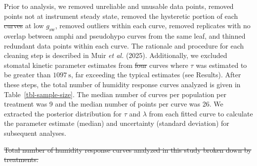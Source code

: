 \documentclass[
  letterpaper,
  DIV=11,
  numbers=noendperiod]{scrartcl}
\newcommand{\gsw}{$g_\mathrm{sw}$}
\providecommand{\DIFaddtex}[1]{{\protect\color{blue}\uwave{#1}}} %
\providecommand{\DIFdeltex}[1]{{\protect\color{red}\sout{#1}}}                      %
\providecommand{\DIFaddbegin}{} %
\providecommand{\DIFaddend}{} %
\providecommand{\DIFdelbegin}{} %
\providecommand{\DIFdelend}{} %
\providecommand{\DIFdelFL}[1]{\DIFdel{#1}} %
\providecommand{\DIFadd}[1]{\texorpdfstring{\DIFaddtex{#1}}{#1}} %
\providecommand{\DIFdel}[1]{\texorpdfstring{\DIFdeltex{#1}}{}} %
\newcommand{\DIFscaledelfig}{0.5}
\newlength{\DIFdelgraphicswidth} %
\newlength{\DIFdelgraphicsheight} %
\newcommand{\DIFaddincludegraphics}[2][]{{\color{blue}\fbox{\DIFOincludegraphics[#1]{#2}}}} %
\newcommand{\DIFdelincludegraphics}[2][]{%
\sbox{\DIFdelgraphicsbox}{\DIFOincludegraphics[#1]{#2}}%
\settoboxwidth{\DIFdelgraphicswidth}{\DIFdelgraphicsbox} %
\settoboxtotalheight{\DIFdelgraphicsheight}{\DIFdelgraphicsbox} %
\scalebox{\DIFscaledelfig}{%
\parbox[b]{\DIFdelgraphicswidth}{\usebox{\DIFdelgraphicsbox}\\[-\baselineskip] \rule{\DIFdelgraphicswidth}{0em}}\llap{\resizebox{\DIFdelgraphicswidth}{\DIFdelgraphicsheight}{%
\setlength{\unitlength}{\DIFdelgraphicswidth}%
\begin{picture}(1,1)%
\thicklines\linethickness{2pt} %
{\color[rgb]{1,0,0}\put(0,0){\framebox(1,1){}}}%
{\color[rgb]{1,0,0}\put(0,0){\line( 1,1){1}}}%
{\color[rgb]{1,0,0}\put(0,1){\line(1,-1){1}}}%
\end{picture}%
}\hspace*{3pt}}} %
} %
\DeclareRobustCommand{\DIFaddbegin}{\DIFOaddbegin \let\includegraphics\DIFaddincludegraphics} %
\DeclareRobustCommand{\DIFaddend}{\DIFOaddend \let\includegraphics\DIFOincludegraphics} %
\DeclareRobustCommand{\DIFdelbegin}{\DIFOdelbegin \let\includegraphics\DIFdelincludegraphics} %
\DeclareRobustCommand{\DIFdelend}{\DIFOaddend \let\includegraphics\DIFOincludegraphics} %
\begin{document}
Prior to analysis, we removed unreliable and unusable data points,
removed points not at instrument steady state, removed the hysteretic
portion of each \DIFdelbegin \DIFdel{curves }\DIFdelend \DIFaddbegin \DIFadd{curve }\DIFaddend at low \gsw{}, removed outliers within each curve,
removed replicates with no overlap between amphi and pseudohypo curves
from the same leaf, and thinned redundant data points within each curve.
The rationale and procedure for each cleaning step is described in Muir
\emph{et al.} (2025). Additionally, we excluded stomatal kinetic
parameter estimates from \DIFdelbegin \DIFdel{four }\DIFdelend \DIFaddbegin \DIFadd{five }\DIFaddend curves where \(\tau\) was estimated to be
greater than \(\SI{1097}{\second}\), far exceeding the typical estimates
(see Results). After these steps, the total number of humidity response
curves analyzed is given in Table~\ref{tbl-sample-size}. The median
number of curves per population per treatment was 9 and the median
number of points per curve was 26. We extracted the posterior
distribution for \(\tau\) and \(\lambda\) from each fitted curve to
calculate the parameter estimate (median) and uncertainty (standard
deviation) for subsequent analyses.

\DIFdelbegin %

{%
\DIFdelFL{Total number of humidity response curves
analyzed in this study broken down by treatments.}}


\end{document}
